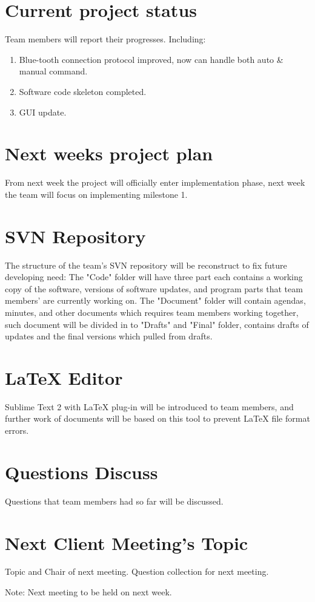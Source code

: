 \documentclass[11pt, a4paper]{article}
\begin{document}
\section{Current project status}
Team members will report their progresses. Including:
\begin{enumerate}
	\item  Blue-tooth connection protocol improved, now can handle both auto \& manual command.
	\item  Software code skeleton completed.
	\item  GUI update.
\end{enumerate}


\section{Next weeks project plan}
From next week the project will officially enter implementation phase, next week the team will focus on implementing milestone 1.


\section{SVN Repository}
The structure of the team's SVN repository will be reconstruct to fix future developing need:
The "Code" folder will have three part each contains a working copy of the software, versions of software updates, and program parts that team members' are currently working on. 
The "Document" folder will contain agendas, minutes, and other documents which requires team members working together, such document will be divided in to "Drafts" and "Final" folder, contains drafts of updates and the final versions which pulled from drafts. 

\section{\LaTeX{} Editor}
Sublime Text 2 with \LaTeX{} plug-in will be introduced to team members, and further work of documents will be based on this tool to prevent \LaTeX{} file format errors. 

\section{Questions Discuss}
Questions that team members had so far will be discussed.

\section{Next Client Meeting's Topic}
Topic and Chair of next meeting. Question collection for next meeting. 

\vspace*{10pt}
\noindent Note: Next meeting to be held on next week.
\end{document}
